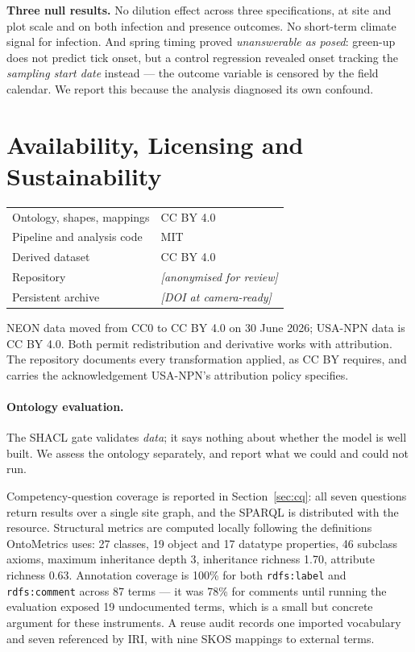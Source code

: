 \textbf{Three null results.} No dilution effect across three specifications, at
site and plot scale and on both infection and presence outcomes. No short-term
climate signal for infection. And spring timing proved \emph{unanswerable as
posed}: green-up does not predict tick onset, but a control regression revealed
onset tracking the \emph{sampling start date} instead --- the outcome variable
is censored by the field calendar. We report this because the analysis
diagnosed its own confound.

\section{Availability, Licensing and Sustainability}

\begin{table}[h]
\centering
\small
\begin{tabular}{ll}
\toprule
Ontology, shapes, mappings & CC BY 4.0 \\
Pipeline and analysis code & MIT \\
Derived dataset            & CC BY 4.0 \\
Repository                 & \textit{[anonymised for review]} \\
Persistent archive         & \textit{[DOI at camera-ready]} \\
\bottomrule
\end{tabular}
\end{table}

NEON data moved from CC0 to CC BY 4.0 on 30 June 2026; USA-NPN data is CC BY
4.0. Both permit redistribution and derivative works with attribution. The
repository documents every transformation applied, as CC BY requires, and
carries the acknowledgement USA-NPN's attribution policy specifies.

\paragraph{Ontology evaluation.} The SHACL gate validates \emph{data}; it
says nothing about whether the model is well built. We assess the ontology
separately, and report what we could and could not run.

Competency-question coverage is reported in Section~\ref{sec:cq}: all seven
questions return results over a single site graph, and the SPARQL is
distributed with the resource. Structural metrics are computed locally
following the definitions OntoMetrics uses: 27 classes, 19 object and 17
datatype properties, 46 subclass axioms, maximum inheritance depth 3,
inheritance richness 1.70, attribute richness 0.63. Annotation coverage is
100\% for both \texttt{rdfs:label} and \texttt{rdfs:comment} across 87 terms
--- it was 78\% for comments until running the evaluation exposed 19
undocumented terms, which is a small but concrete argument for these
instruments. A reuse audit records one imported vocabulary and seven
referenced by IRI, with nine SKOS mappings to external terms.

